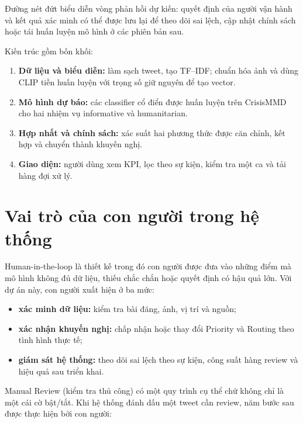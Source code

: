 Đường nét đứt biểu diễn vòng phản hồi dự kiến: quyết định của người vận hành
và kết quả xác minh có thể được lưu lại để theo dõi sai lệch, cập nhật chính
sách hoặc tái huấn luyện mô hình ở các phiên bản sau.

Kiến trúc gồm bốn khối:

\begin{enumerate}[leftmargin=*]
  \item \textbf{Dữ liệu và biểu diễn:} làm sạch tweet, tạo TF--IDF; chuẩn hóa
        ảnh và dùng CLIP tiền huấn luyện với trọng số giữ nguyên để tạo vector.
  \item \textbf{Mô hình dự báo:} các classifier cổ điển được huấn luyện trên
        CrisisMMD cho hai nhiệm vụ informative và humanitarian.
  \item \textbf{Hợp nhất và chính sách:} xác suất hai phương thức được căn
        chỉnh, kết hợp và chuyển thành khuyến nghị.
  \item \textbf{Giao diện:} người dùng xem KPI, lọc theo sự kiện, kiểm tra một
        ca và tải hàng đợi xử lý.
\end{enumerate}

\section{Vai trò của con người trong hệ thống}

Human-in-the-loop là thiết kế trong đó con người được đưa vào những điểm mà
mô hình không đủ dữ liệu, thiếu chắc chắn hoặc quyết định có hậu quả lớn. Với
dự án này, con người xuất hiện ở ba mức:

\begin{itemize}[leftmargin=*]
  \item \textbf{xác minh dữ liệu:} kiểm tra bài đăng, ảnh, vị trí và nguồn;
  \item \textbf{xác nhận khuyến nghị:} chấp nhận hoặc thay đổi Priority và
        Routing theo tình hình thực tế;
  \item \textbf{giám sát hệ thống:} theo dõi sai lệch theo sự kiện, công suất
        hàng review và hiệu quả sau triển khai.
\end{itemize}

Manual Review (kiểm tra thủ công) có một quy trình cụ thể chứ không chỉ là một
cái cờ bật/tắt. Khi hệ thống đánh dấu một tweet cần review, năm bước sau được
thực hiện bởi con người:

